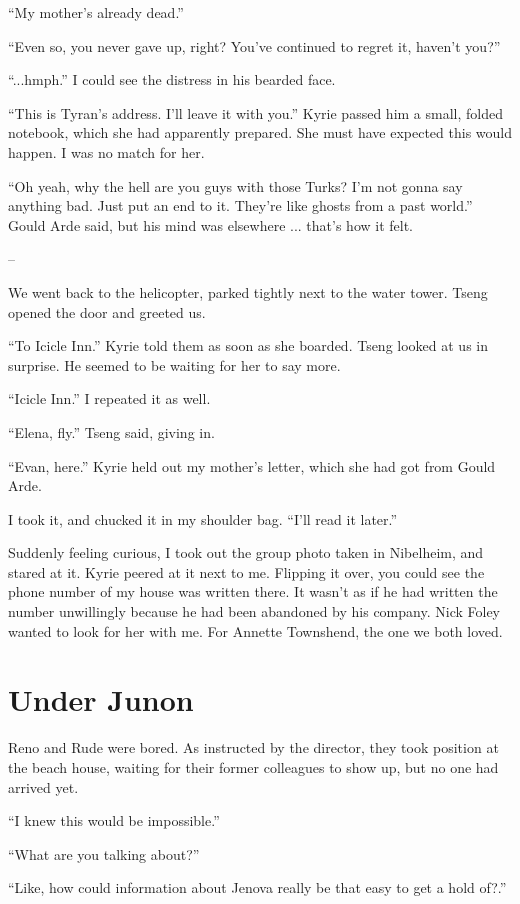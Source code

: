 \documentclass[oneside]{book}
\begin{document}
“My mother’s already dead.”

“Even so, you never gave up, right? You’ve continued to regret it, haven’t you?”

“...hmph.” I could see the distress in his bearded face.

“This is Tyran’s address. I’ll leave it with you.” Kyrie passed him a small, folded notebook, which she had apparently prepared. She must have expected this would happen. I was no match for her.

“Oh yeah, why the hell are you guys with those Turks? I’m not gonna say anything bad. Just put an end to it. They’re like ghosts from a past world.” Gould Arde said, but his mind was elsewhere ... that’s how it felt.

–

We went back to the helicopter, parked tightly next to the water tower. Tseng opened the door and greeted us.

“To Icicle Inn.” Kyrie told them as soon as she boarded. Tseng looked at us in surprise. He seemed to be waiting for her to say more.

“Icicle Inn.” I repeated it as well.

“Elena, fly.” Tseng said, giving in.

“Evan, here.” Kyrie held out my mother’s letter, which she had got from Gould Arde.

I took it, and chucked it in my shoulder bag. “I’ll read it later.”

Suddenly feeling curious, I took out the group photo taken in Nibelheim, and stared at it. Kyrie peered at it next to me. Flipping it over, you could see the phone number of my house was written there. It wasn’t as if he had written the number unwillingly because he had been abandoned by his company. Nick Foley wanted to look for her with me. For Annette Townshend, the one we both loved.

\chapter{Under Junon}
Reno and Rude were bored. As instructed by the director, they took position at the beach house, waiting for their former colleagues to show up, but no one had arrived yet.

“I knew this would be impossible.”

“What are you talking about?”

“Like, how could information about Jenova really be that easy to get a hold of?.”
\end{document}

